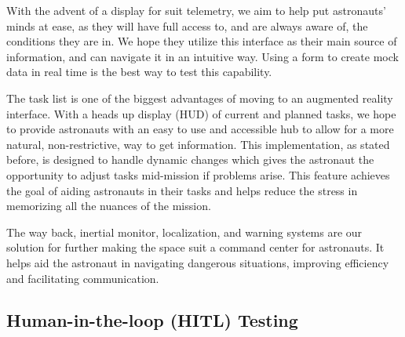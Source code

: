\documentclass{article}
\let\Oldsubsection\subsection
\renewcommand{\subsection}{\FloatBarrier\Oldsubsection}
\begin{document}
With the advent of a display for suit telemetry, we aim to help put astronauts’ minds at ease, as they will have full access to, and are always aware of, the conditions they are in. We hope they utilize this interface as their main source of information, and can navigate it in an intuitive way. Using a form to create mock data in real time is the best way to test this capability.

The task list is one of the biggest advantages of moving to an augmented reality interface. With a heads up display (HUD) of current and planned tasks, we hope to provide astronauts with an easy to use and accessible hub to allow for a more natural, non-restrictive, way to get information. This implementation, as stated before, is designed to handle dynamic changes which gives the astronaut the opportunity to adjust tasks mid-mission if problems arise. This feature achieves the goal of aiding astronauts in their tasks and helps reduce the stress in memorizing all the nuances of the mission.

The way back, inertial monitor, localization, and warning systems are our solution for further making the space suit a command center for astronauts. It helps aid the astronaut in navigating dangerous situations, improving efficiency and facilitating communication.

\subsection{Human-in-the-loop (HITL) Testing}
\end{document}
